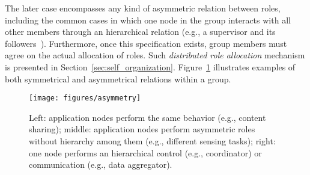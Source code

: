The later case encompasses any kind of asymmetric relation between roles, including the common cases in which one node in the group interacts with all other members through an hierarchical relation (e.g., a supervisor and its followers~\cite{Baresi:2011}). Furthermore, once this specification exists, group members must agree on the actual allocation of roles. Such \textit{distributed role allocation} mechanism is presented in Section~\ref{sec:self_organization}. Figure~\ref{fig:asymmetry} illustrates examples of both symmetrical and asymmetrical relations within a group. 

\begin{figure}[t!]
	\centering
	\texttt{[image: figures/asymmetry]}
	\caption{Left: application nodes perform the same behavior (e.g., content sharing); middle: application nodes perform asymmetric roles without hierarchy among them (e.g., different sensing tasks); right: one node performs an hierarchical control (e.g., coordinator) or communication (e.g., data aggregator).}
	\label{fig:asymmetry}
\end{figure}








